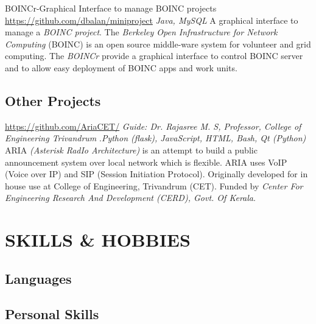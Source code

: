 \documentclass[11pt, a4paper, sans]{moderncv}
\begin{document}
{BOINCr-Graphical Interface to manage BOINC projects}
{\newline \url{https://github.com/dbalan/miniproject}}{}
{\hfill \textit{Java, MySQL}}
{A graphical interface to manage a \textit{BOINC project}. The \textit{Berkeley Open Infrastructure for Network Computing} (BOINC) is an open source middle-ware system for volunteer and grid computing. The \textit{BOINCr} provide a graphical interface to control BOINC server and to allow easy deployment of BOINC apps and work units. \newline}

\fi

\subsection{Other Projects}

{\newline \url{https://github.com/AriaCET/}}
{\newline \textit{Guide: Dr. Rajasree M. S, Professor, College of Engineering Trivandrum}}
{\newline.\hfill \textit{Python (flask), JavaScript, HTML, Bash, Qt (Python)}}
{ARIA \textit{(Asterisk RadIo Architecture)} is an attempt to build a public announcement system over local network which is flexible. ARIA uses VoIP (Voice over IP) and SIP (Session Initiation Protocol). Originally developed for in house use at College of Engineering, Trivandrum (CET). Funded by \textit{Center For Engineering Research And Development (CERD), Govt. Of Kerala}. \newline}

\section{SKILLS \& HOBBIES}
\subsection{Languages}

\subsection{Personal Skills}
\end{document}
